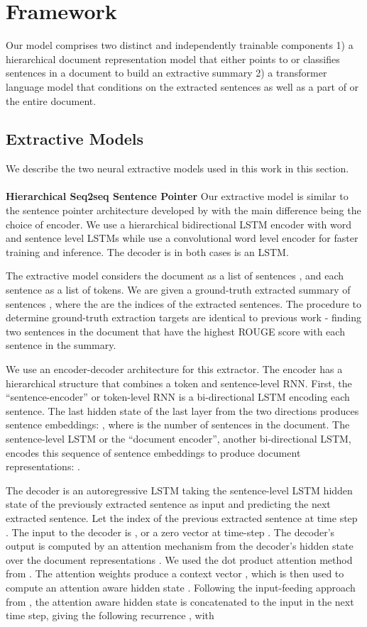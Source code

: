 \documentclass[letterpaper]{article} \usepackage{arXiv_V2_aaai_sty_mods}  \usepackage{times}  \usepackage{helvet} \usepackage{courier}  \usepackage[hyphens]{url}  \usepackage{graphicx} \usepackage[utf8]{inputenc} \usepackage[T1]{fontenc}    \usepackage{url}            \usepackage{booktabs}       \usepackage{amsfonts}       \usepackage{nicefrac}       \usepackage{multirow}
\begin{document}
\section{Framework}
Our model comprises two distinct and independently trainable components 1) a hierarchical document representation model that either points to or classifies sentences in a document to build an extractive summary 2) a transformer language model that conditions on the extracted sentences as well as a part of or the entire document.

\subsection{Extractive Models}
\label{sec:extractive_model}
We describe the two neural extractive models used in this work in this section. \\ \\
\textbf{Hierarchical Seq2seq Sentence Pointer}
Our extractive model is similar to the sentence pointer architecture developed by \cite{chen2018fast} with the main difference being the choice of encoder. We use a hierarchical bidirectional LSTM encoder with word and sentence level LSTMs while \cite{chen2018fast} use a convolutional word level encoder for faster training and inference. The decoder is in both cases is an LSTM.

The extractive model considers the document as a list of  sentences , and each sentence as a list of tokens. We are given a ground-truth extracted summary of  sentences , where the  are the indices of the extracted sentences.
The procedure to determine ground-truth extraction targets are identical to previous work - finding two sentences in the document that have the highest ROUGE score with each sentence in the summary.

We use an encoder-decoder architecture for this extractor.
The encoder has a hierarchical structure that combines a token and sentence-level RNN. First, the ``sentence-encoder'' or token-level RNN is a bi-directional LSTM \cite{Hochreiter:1997:LSM:1246443.1246450} encoding each sentence. The last hidden state of the last layer from the two directions produces sentence embeddings: , where  is the number of sentences in the document. The sentence-level LSTM or the ``document encoder'', another bi-directional LSTM, encodes this sequence of sentence embeddings to produce document representations: .

The decoder is an autoregressive LSTM taking the sentence-level LSTM hidden state of the previously extracted sentence as input and predicting the next extracted sentence.
Let  the index of the previous extracted sentence at time step . The input to the decoder is , or a zero vector at time-step .
The decoder's output is computed by an attention mechanism from the decoder's hidden state  over the document representations .
We used the dot product attention method from \cite{luong2015effective}.
The attention weights  produce a context vector , which is then used to compute an attention aware hidden state .
Following the input-feeding approach from \cite{luong2015effective}, the attention aware hidden state  is concatenated to the input in the next time step, giving the following recurrence
, with
\end{document}
